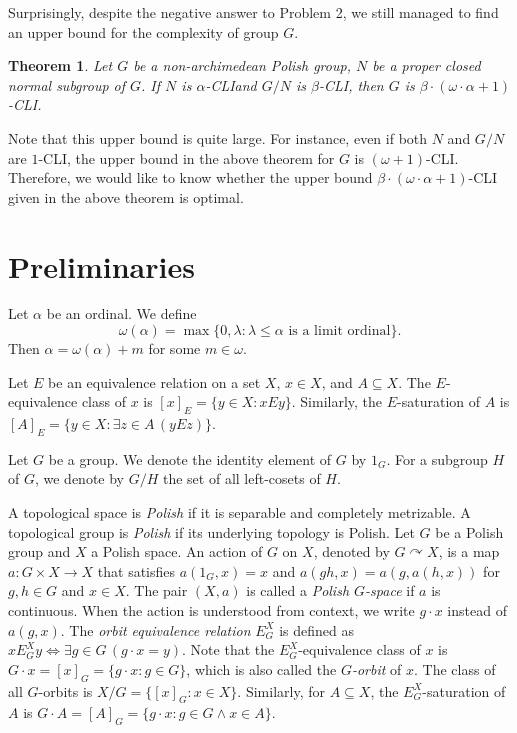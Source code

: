 \documentclass[11pt]{amsart}
\newtheorem{theorem}{Theorem}[section]
\theoremstyle{definition}
\theoremstyle{remark}
\numberwithin{equation}{section}
\def\hier#1{$#1$-CLI}
\begin{document}
Surprisingly, despite the negative answer to Problem 2, we still managed to find an upper bound for the complexity of group $G$.

\begin{theorem}
    Let $G$ be a non-archimedean Polish group, $N$ be a proper closed normal subgroup of $G$. If $N$ is \hier\alpha\space and $G/N$ is \hier\beta, then $G$ is \hier{\beta\cdot(\omega\cdot\alpha+1)}.
\end{theorem}

Note that this upper bound is quite large. For instance, even if both $N$ and $G/N$ are \hier{1}, the upper bound in the above theorem for $G$ is \hier{(\omega+1)}.
Therefore, we would like to know whether the upper bound \hier{\beta\cdot(\omega\cdot\alpha+1)} given in the above theorem is optimal.


\setcounter{problem}{0}

\section{Preliminaries}

Let $\alpha$ be an ordinal. We define
$$\omega(\alpha)=\max\{0,\lambda:\lambda\le\alpha\mbox{ is a limit ordinal}\}.$$
Then $\alpha=\omega(\alpha)+m$ for some $m\in\omega$.

Let $E$ be an equivalence relation on a set $X$, $x\in X$, and $A\subseteq X$. The $E$-equivalence class of $x$ is $[x]_E=\{y\in X:xEy\}$. Similarly, the $E$-saturation of $A$ is $[A]_E=\{y\in X:\exists z\in A\,(yEz)\}$.

Let $G$ be a group. We denote the identity element of $G$ by $1_G$. For a subgroup $H$ of $G$, we denote by $G/H$ the set of all left-cosets of $H$.

A topological space is {\it Polish} if it is separable and completely metrizable. A topological group is {\it Polish} if its underlying topology is Polish. Let $G$ be a Polish group and $X$ a Polish space. An action of $G$ on $X$, denoted by $G\curvearrowright X$, is a map $a:G\times X\to X$ that satisfies $a(1_G,x)=x$ and $a(gh,x)=a(g,a(h,x))$ for $g,h\in G$ and $x\in X$. The pair $(X,a)$ is called a {\it Polish $G$-space} if $a$ is continuous. When the action is understood from context, we write $g\cdot x$ instead of $a(g,x)$.
The {\it orbit equivalence relation} $E_G^X$ is defined as $xE_G^Xy\iff\exists g\in G\,(g\cdot x=y)$. Note that the $E_G^X$-equivalence class of $x$ is $G\cdot x=[x]_G=\{g\cdot x:g\in G\}$, which is also called the {\it $G$-orbit} of $x$. The class of all $G$-orbits is $X/G=\{[x]_G:x\in X\}$. Similarly, for $A\subseteq X$, the $E_G^X$-saturation of $A$ is $G\cdot A=[A]_G=\{g\cdot x:g\in G\land x\in A\}$.
\end{document}
